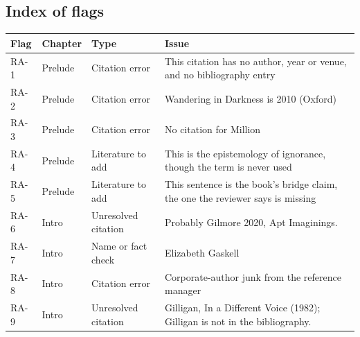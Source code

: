 \documentclass[
  letterpaper,
  DIV=11,
  numbers=noendperiod]{scrartcl}
\newcounter{none} %
\theoremstyle{remark}
\begin{document}
\subsection*{Index of flags}\label{index-of-flags}

{\def\LTcaptype{none} %
\begin{longtable}[]{@{}
  >{\raggedright\arraybackslash}p{}
  >{\raggedright\arraybackslash}p{}
  >{\raggedright\arraybackslash}p{}
  >{\raggedright\arraybackslash}p{}@{}}
\toprule\noalign{}
\begin{minipage}[b]{\linewidth}\raggedright
Flag
\end{minipage} & \begin{minipage}[b]{\linewidth}\raggedright
Chapter
\end{minipage} & \begin{minipage}[b]{\linewidth}\raggedright
Type
\end{minipage} & \begin{minipage}[b]{\linewidth}\raggedright
Issue
\end{minipage} \\
\midrule\noalign{}
\endhead
\bottomrule\noalign{}
\endlastfoot
RA-1 & Prelude & Citation error & This citation has no author, year or
venue, and no bibliography entry \\
RA-2 & Prelude & Citation error & Wandering in Darkness is 2010
(Oxford) \\
RA-3 & Prelude & Citation error & No citation for Million \\
RA-4 & Prelude & Literature to add & This is the epistemology of
ignorance, though the term is never used \\
RA-5 & Prelude & Literature to add & This sentence is the book's bridge
claim, the one the reviewer says is missing \\
RA-6 & Intro & Unresolved citation & Probably Gilmore 2020, Apt
Imaginings. \\
RA-7 & Intro & Name or fact check & Elizabeth Gaskell \\
RA-8 & Intro & Citation error & Corporate-author junk from the reference
manager \\
RA-9 & Intro & Unresolved citation & Gilligan, In a Different Voice
(1982); Gilligan is not in the bibliography. \\

\end{longtable}}
\end{document}
